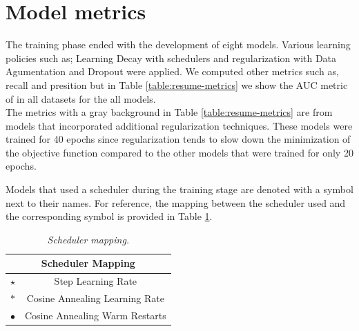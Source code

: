 \section{Model metrics}

The training phase ended with the development of eight models. Various learning
policies such as; Learning Decay with schedulers and regularization with Data
Agumentation and Dropout were applied. We computed other metrics such as,
recall and presition but in Table \ref{table:resume-metrics} we show the AUC
metric of in all datasets for the all models. \\

The metrics with a gray background in Table \ref{table:resume-metrics}
are from models that incorporated additional regularization techniques. These
models were trained for 40 epochs since regularization tends to slow down the
minimization of the objective function compared to the other models that were
trained for only 20 epochs. \\


\newpage

Models that used a scheduler during the training stage are denoted with a
symbol next to their names. For reference, the mapping between the scheduler
used and the corresponding symbol is provided in Table
\ref{table:scheduler-mapping}.


\begin{table}[H]
  \centering
  \begin{tabular}{cc}
    \toprule
    \multicolumn{2}{c}{\textbf{Scheduler Mapping}} \\
    \midrule
    $\star$     & Step Learning Rate \\
    $\ast$      & Cosine Annealing Learning Rate \\
    $\bullet$   & Cosine Annealing Warm Restarts \\
    \bottomrule
  \end{tabular}
  \caption[Scheduler mapping]
  {\textit{Scheduler mapping.}}
  \label{table:scheduler-mapping}
\end{table}

